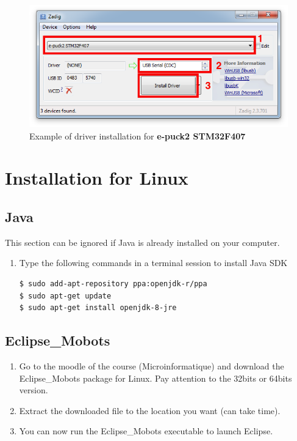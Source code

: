 \documentclass[a4paper]{article}
\begin{document}
\begin{figure}[!h]
\centering
\includegraphics[width=0.7\columnwidth]{fig/Zadig_e-puck2_STM32F407}
\caption{Example of driver installation for \textbf{e-puck2 STM32F407}}
\label{fig:Zadig_e-puck2_STM32F407}
\end{figure}

\newpage
\section{Installation for Linux}

\subsection{Java}
This section can be ignored if Java is already installed on your computer.

\begin{enumerate}
\item Type the following commands in a terminal session to install Java SDK
\begin{lstlisting}
$ sudo add-apt-repository ppa:openjdk-r/ppa
$ sudo apt-get update
$ sudo apt-get install openjdk-8-jre
\end{lstlisting}
\end{enumerate}


\subsection{Eclipse\_Mobots}

\begin{enumerate}
\item Go to the moodle of the course (Microinformatique) and download the Eclipse\_Mobots package for Linux.
Pay attention to the 32bits or 64bits version.
\item Extract the downloaded file to the location you want (can take time). 
\item You can now run the Eclipse\_Mobots executable to launch Eclipse.
\end{enumerate}
\end{document}
